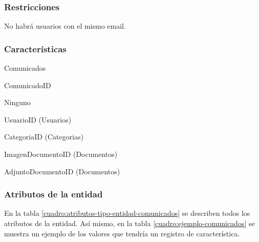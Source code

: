 \subsubsection*{Restricciones}
No habrá usuarios con el mismo email.

\subsubsection*{Características}
\begin{description}[nosep,style=multiline,labelindent=0.8cm,leftmargin=4.5cm,font=\normalfont]
    \item[Nombre] Comunicados
    \item[Id. principal] ComunicadoID
    \item[Id. alternativo] Ninguno
    \item[Atrib. heredados] 
        UsuarioID (Usuarios)

        CategoriaID (Categorias)

        ImagenDocumentoID (Documentos)

        AdjuntoDocumentoID (Documentos)
\end{description}

\subsubsection*{Atributos de la entidad}
En la tabla \ref{cuadro:atributos-tipo-entidad-comunicados} se describen todos los atributos de la entidad. Así mismo, en la tabla \ref{cuadro:ejemplo-comunicados} se muestra un ejemplo de los valores que tendría un registro de característica.

